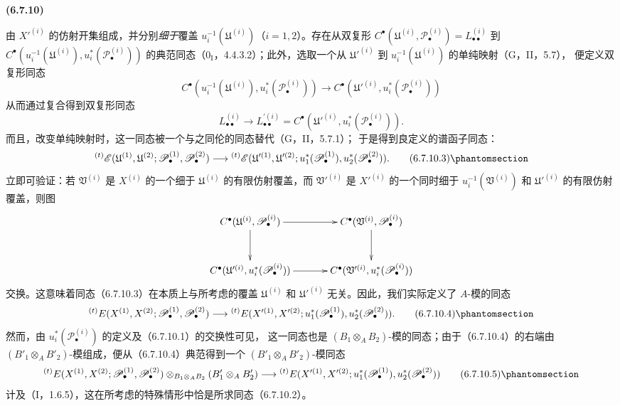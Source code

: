 \documentclass[UTF8,fontset=none,11pt,oneside,openany]{ctexbook}
\newenvironment{env}[1][]{%
  \par\medskip\noindent\textbf{(#1)}\ %
}{\par}
\let\EGAOriginalLabel\label
\renewcommand{\label}[1]{\phantomsection\EGAOriginalLabel{#1}}
\begin{document}
\begin{env}[6.7.10]
由 $X'^{(i)}$ 的仿射开集组成，并分别\emph{细于}覆盖
$u_i^{-1}(\mathfrak U^{(i)})$（$i=1,2$）。存在从双复形
$C^\bullet(\mathfrak U^{(i)},\mathscr P_\bullet^{(i)})
=L_{\bullet\bullet}^{(i)}$ 到
$C^\bullet(u_i^{-1}(\mathfrak U^{(i)}),u_i^*(\mathscr P_\bullet^{(i)}))$
的典范同态（$0_{\mathrm I}$，4.4.3.2）；此外，选取一个从
$\mathfrak U'^{(i)}$ 到 $u_i^{-1}(\mathfrak U^{(i)})$ 的单纯映射（G，II，5.7），
便定义双复形同态
\[
  C^\bullet(u_i^{-1}(\mathfrak U^{(i)}),u_i^*(\mathscr P_\bullet^{(i)}))
  \longrightarrow
  C^\bullet(\mathfrak U'^{(i)},u_i^*(\mathscr P_\bullet^{(i)}))
\]
从而通过复合得到双复形同态
\[
  L_{\bullet\bullet}^{(i)}
  \longrightarrow
  L_{\bullet\bullet}^{\prime(i)}
  =C^\bullet(\mathfrak U'^{(i)},u_i^*(\mathscr P_\bullet^{(i)})).
\]
而且，改变单纯映射时，这一同态被一个与之同伦的同态替代（G，II，5.7.1）；
于是得到良定义的谱函子同态：
\[
  {}^{(t)}\mathscr E
  (\mathfrak U^{(1)},\mathfrak U^{(2)};
   \mathscr P_\bullet^{(1)},\mathscr P_\bullet^{(2)})
  \longrightarrow
  {}^{(t)}\mathscr E
  (\mathfrak U'^{(1)},\mathfrak U'^{(2)};
   u_1^*(\mathscr P_\bullet^{(1)}),u_2^*(\mathscr P_\bullet^{(2)})).
  \tag{6.7.10.3}\label{III.6.7.10.3.fr}
\]
立即可验证：若 $\mathfrak V^{(i)}$ 是 $X^{(i)}$ 的一个细于
$\mathfrak U^{(i)}$ 的有限仿射覆盖，而 $\mathfrak V'^{(i)}$ 是
$X'^{(i)}$ 的一个同时细于 $u_i^{-1}(\mathfrak V^{(i)})$ 和
$\mathfrak U'^{(i)}$ 的有限仿射覆盖，则图
\[
\xymatrix@C=34pt@R=30pt{
  C^\bullet(\mathfrak U^{(i)},\mathscr P_\bullet^{(i)})
  \ar[r]\ar[d]
  & C^\bullet(\mathfrak V^{(i)},\mathscr P_\bullet^{(i)})\ar[d]
  \\
  C^\bullet(\mathfrak U'^{(i)},u_i^*(\mathscr P_\bullet^{(i)}))
  \ar[r]
  & C^\bullet(\mathfrak V'^{(i)},u_i^*(\mathscr P_\bullet^{(i)}))
}
\]
交换。这意味着同态（6.7.10.3）在本质上与所考虑的覆盖
$\mathfrak U^{(i)}$ 和 $\mathfrak U'^{(i)}$ 无关。因此，我们实际定义了
$A$-模的同态
\[
  {}^{(t)}E
  (X^{(1)},X^{(2)};\mathscr P_\bullet^{(1)},\mathscr P_\bullet^{(2)})
  \longrightarrow
  {}^{(t)}E
  (X'^{(1)},X'^{(2)};
   u_1^*(\mathscr P_\bullet^{(1)}),u_2^*(\mathscr P_\bullet^{(2)})).
  \tag{6.7.10.4}\label{III.6.7.10.4.fr}
\]
然而，由 $u_i^*(\mathscr P_\bullet^{(i)})$ 的定义及（6.7.10.1）的交换性可见，
这一同态也是 $(B_1\otimes_A B_2)$-模的同态；由于（6.7.10.4）的右端由
$(B'_1\otimes_A B'_2)$-模组成，便从（6.7.10.4）典范得到一个
$(B'_1\otimes_A B'_2)$-模同态
\[
  {}^{(t)}E
  (X^{(1)},X^{(2)};\mathscr P_\bullet^{(1)},\mathscr P_\bullet^{(2)})
  \otimes_{B_1\otimes_A B_2}(B'_1\otimes_A B'_2)
  \longrightarrow
  {}^{(t)}E
  (X'^{(1)},X'^{(2)};
   u_1^*(\mathscr P_\bullet^{(1)}),u_2^*(\mathscr P_\bullet^{(2)}))
  \tag{6.7.10.5}\label{III.6.7.10.5.fr}
\]
计及（I，1.6.5），这在所考虑的特殊情形中恰是所求同态（6.7.10.2）。


\end{env}
\end{document}
